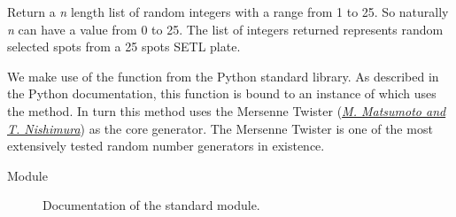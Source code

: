 \documentclass[letterpaper,10pt,english]{sphinxmanual}
\begin{document}
\begin{fulllineitems}
\label{setlyze/std:setlyze.std.get_random_for_plate}
Return a \emph{n} length list of random integers with a range from 1
to 25. So naturally \emph{n} can have a value from 0 to 25. The list of
integers returned represents random selected spots from a 25 spots
SETL plate.

We make use of the  function from the Python
standard library. As described in the Python documentation, this
function is bound to an instance of  which
uses the  method. In turn this method uses
the Mersenne Twister ({\hyperref[references:ref-mersenne-twister]{\emph{M. Matsumoto and T. Nishimura}}})
as the core generator. The Mersenne Twister is one of the most
extensively tested random number generators in existence.



\begin{description}
\item[{Module \href{http://docs.python.org/library/random.html\#module-random}{}}] \leavevmode
Documentation of the \href{http://docs.python.org/library/random.html\#module-random}{} standard module.

\end{description}



\end{fulllineitems}

\end{document}

